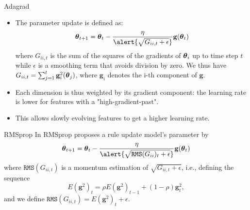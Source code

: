 \documentclass[handout,xcolor=pdftex,dvipsnames,table,mathserif]{beamer}
\begin{document}

\begin{frame}{Adagrad \cite{duchi2011adaptive}}
\begin{itemize}
	\item The parameter update is defined as:
		\begin{equation}
			\param_{t+1}= \param_{t}- \frac{\eta}{\alert{\sqrt { G_{ii,t}+\epsilon  }}} \mathbf{g}(\param_{t})
		\end{equation}
	 	  where $G_{ii,t}$ is the sum of the squares of the gradients of $\boldsymbol{\theta}_i$ up to time step $t$ while $\epsilon$ is a smoothing term that avoids division by zero. We thus have
	 	  $G_{ii,t}=\sum_{j=1}^{t}  \mathbf{g}^2_{i}(\boldsymbol{\theta}_{j})$, where $\mathbf{g}_{i}$ denotes the i-th component of $\mathbf{g}$.
	\item Each dimension is thus weighted by its gradient component: the learning rate is lower for features with a "high-gradient-past". 
	\item This allows slowly evolving features to get a higher learning rate. 
\end{itemize}
\end{frame}

\begin{frame}{RMSprop \cite{hinton2012neural}}
In RMSprop \cite{hinton2012neural} proposes a rule update model's parameter by
\begin{equation}
\param_{t+1}= \param_{t}- \frac{\eta}{\alert{\sqrt { \texttt{RMS}(G_{ii})_{t}+\epsilon  }}} \mathbf{g}(\param_{t})
\end{equation}
where  $\texttt{RMS}(G_{ii,t})$ is a momentum estimation of $\sqrt { G_{ii,t}+\epsilon}$, i.e., 
defining the sequence 
\begin{equation*}
E(\mathbf{g}^2)_{t}=\rho E(\mathbf{g}^2)_{t-1} + (1-\rho) \mathbf{g}^2_t,
\end{equation*}
and we define $\texttt{RMS}(G_{ii,t})=E(\mathbf{g}^2)_{t}+\epsilon$.

\end{frame}
\end{document}
